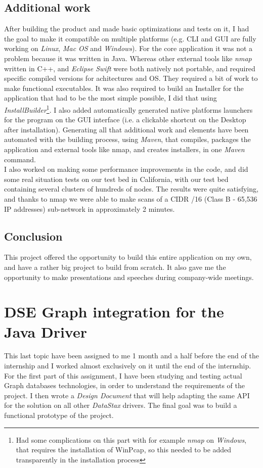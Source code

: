 \documentclass[a4paper]{report}
\newcommand{\ds}{\emph{DataStax\xspace}}
\begin{document}
\section{Additional work}
After building the product and made basic optimizations and tests on it, I had the goal to make it compatible on multiple platforms (e.g. CLI and GUI are fully working on \emph{Linux}, \emph{Mac OS} and \emph{Windows}). For the core application it was not a problem because it was written in Java. Whereas other external tools like \emph{nmap} written in C++, and \emph{Eclipse Swift} were both natively not portable, and required specific compiled versions for achitectures and OS. They required a bit of work to make functional executables. It was also required to build an Installer for the application that had to be the most simple possible, I did that using \emph{InstallBuilder}\footnote{Had some complications on this part with for example \emph{nmap} on \emph{Windows}, that requires the installation of WinPcap, so this needed to be added transparently in the installation process}. I also added automatically generated native platforms launchers for the program on the GUI interface (i.e. a clickable shortcut on the Desktop after installation). Generating all that additional work and elements have been automated with the building process, using \emph{Maven}, that compiles, packages the application and external tools like nmap, and creates installers, in one \emph{Maven} command.\\
I also worked on making some performance improvements in the code, and did some real situation tests on our test bed in California, with our test bed containing several clusters of hundreds of nodes. The results were quite satisfying, and thanks to nmap we were able to make scans of a CIDR /16 (Class B - 65,536 IP addresses) sub-network in approximately 2 minutes.

\section{Conclusion}
This project offered the opportunity to build this entire application on my own, and have a rather big project to build from scratch. It also gave me the opportunity to make presentations and speeches during company-wide meetings.


\chapter{DSE Graph integration for the Java Driver}
This last topic have been assigned to me 1 month and a half before the end of the internship and I worked almost exclusively on it until the end of the internship.\\
For the first part of this assignment, I have been studying and testing actual Graph databases technologies, in order to understand the requirements of the project. I then wrote a \emph{Design Document} that will help adapting the same API for the solution on all other \ds{} drivers. The final goal was to build a functional prototype of the project.
\end{document}
